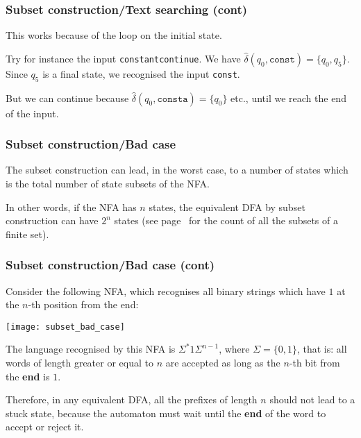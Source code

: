 % 
\begin{frame}
\frametitle{Subset construction/Text searching (cont)}

This works because of the loop on the initial state.

\bigskip

Try for instance the input \texttt{constantcontinue}. We have
\(\hat{\delta}(q_0, \texttt{const}) = \{q_0, q_5\}\). Since \(q_5\) is
a final state, we recognised the input \texttt{const}. 

\bigskip

But we can continue because \(\hat{\delta}(q_0, \texttt{consta}) =
\{q_0\}\) etc., until we reach the end of the input.

\end{frame}

% 
\begin{frame}
\frametitle{Subset construction/Bad case}

The subset construction can lead, in the worst case, to a number of
states which is the total number of state subsets of the NFA.

\bigskip

In other words, if the NFA has \(n\) states, the equivalent DFA by
subset construction can have \(2^n\) states (see
page~\pageref{state_explosion} for the count of all the subsets of a
finite set).

\end{frame}

% 
\begin{frame}
\frametitle{Subset construction/Bad case (cont)}

Consider the following NFA, which recognises all binary strings which
have \(1\) at the \(n\)-th position from the end:
\begin{center}
\texttt{[image: subset\_bad\_case]}
\end{center}
The language recognised by this NFA is \(\Sigma^{*} 1 \Sigma^{n-1}\),
where \(\Sigma=\{0,1\}\), that is: all words of length greater or
equal to \(n\) are accepted as long as the \(n\)-th bit from the
\textbf{end} is \(1\).

\bigskip

Therefore, in any equivalent DFA, all the prefixes of length \(n\)
should not lead to a stuck state, because the automaton must wait
until the \textbf{end} of the word to accept or reject it.

\end{frame}

